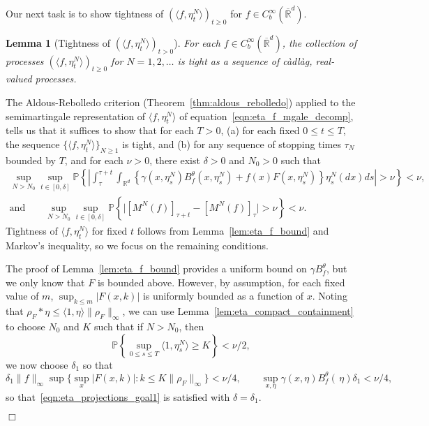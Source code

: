 \documentclass[12pt]{article}
\newenvironment {proof}{{\noindent\bf Proof }}{\hfill $\Box$ \medskip}
\newtheorem{lemma}[theorem]{Lemma}
\newcommand{\IP}{\mathbb P}
\newcommand{\IR}{\mathbb R}
\newcommand{\kernel}{\rho}  %
\newcommand{\smooth}[1]{\kernel_{#1} \! * \!}  %
\numberwithin{equation}{section}
\begin{document}
Our next task is to show tightness of 
$(\langle f,\eta_t^N\rangle)_{t\geq 0}$ for 
$f\in C_b^\infty(\overline{\IR}^d)$. 

\begin{lemma}[Tightness of $(\langle f, \eta^{N}_t \rangle )_{t>0}$]
    \label{lem:eta_projections_tightness}
	For each $f \in C^{\infty}_{b}(\overline{\IR}^d)$, 
the collection of processes
$(\langle f, \eta^{N}_t \rangle)_{t \geq 0}$
for $N = 1, 2, \ldots$ is tight
as a sequence of c\`adl\`ag, real-valued processes.
\end{lemma}
\begin{proof}
The Aldous-Rebolledo criterion (Theorem~\ref{thm:aldous_rebolledo})
applied to the semimartingale representation of $\langle f, \eta^N_t\rangle$
of equation~\eqref{eqn:eta_f_mgale_decomp}, tells us
that it suffices to show that for each $T>0$,
(a) for each fixed $0\leq t\leq T$, the sequence $\{\langle f, \eta^N_t \rangle\}_{N \ge 1}$ is tight,
and (b) for any sequence of stopping times $\tau_N$ bounded by $T$,
and for each $\nu > 0$, there exist $\delta > 0$ and $N_0 > 0$ such that 
\begin{gather}
        \label{eqn:eta_projections_goal1}
    \sup_{N > N_0}
    \sup_{t \in [0, \delta]}
    \IP\left\{\left|
            \int_\tau^{\tau + t}
            \int_{\IR^d}
            \left\{
                \gamma(x, \eta^N_s) B^\theta_f(x, \eta^N_s)
                + f(x) F(x, \eta^N_s)
            \right\} 
            \eta^N_s(dx)
            ds
        \right|> \nu \right\}
        < \nu ,
    \\ \text{and} \qquad
        \label{eqn:eta_projections_goal2}
    \sup_{N > N_0}
    \sup_{t \in [0, \delta]}
    \IP\left\{\big|
        [M^{N}(f)]_{\tau + t} 
            - [M^{N}(f)]_\tau \big|
        > \nu
    \right\}
    < \nu.
\end{gather}
Tightness of $\langle f, \eta^N_t\rangle$ for fixed $t$
follows from Lemma~\ref{lem:eta_f_bound} and Markov's inequality,
so we focus on the remaining conditions.

The proof of Lemma~\ref{lem:eta_f_bound}
provides a uniform bound on $\gamma B^\theta_f$, but we only know
that $F$ is bounded above. However, by assumption, for each fixed value of
$m$, $\sup_{k\leq m}|F(x,k)|$ is uniformly bounded as a function of $x$.
Noting that $\smooth{F}\eta\leq \langle 1,\eta\rangle\|\rho_F\|_\infty$,
we can use Lemma~\ref{lem:eta_compact_containment} 
to choose $N_0$ and $K$ such that
if $N > N_0$, then
$$
    \IP\left\{\sup_{0\leq s\leq T}\langle 1, \eta_s^N\rangle\geq K\right\} < \nu/2,
$$
we now choose $\delta_1$ so that
$$
    \delta_1 \|f\|_\infty \sup\big\{ \sup_{x}|F(x,k)| : k\leq K\|\rho_F\|_\infty \big\}
    <
    \nu/4,
    \qquad
    \sup_{x,\eta}\gamma(x,\eta)B^\theta_f(\,\eta)\delta_1 < \nu/4,
$$
so that~\eqref{eqn:eta_projections_goal1} is satisfied with $\delta = \delta_1$.


\end{proof}
\end{document}
